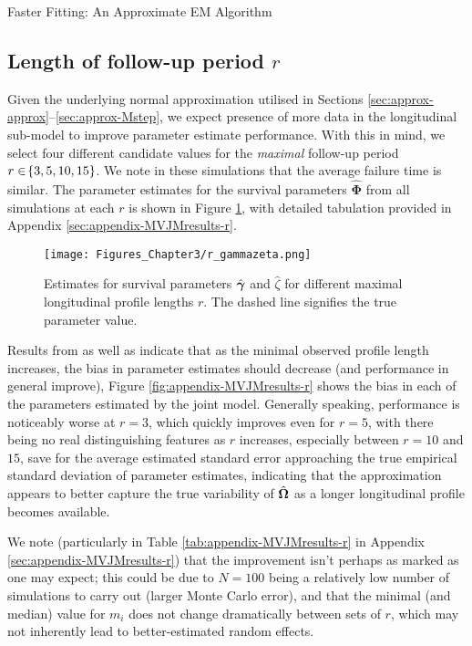 \begin{chapter}{\label{cha:approx}Faster Fitting: An Approximate EM Algorithm}
  \subsection{Length of follow-up period \texorpdfstring{$r$}{r}}\label{sec:approx-sims-r}
  Given the underlying normal approximation utilised in Sections \ref{sec:approx-approx}--\ref{sec:approx-Mstep}, we expect presence of more data in the longitudinal sub-model to improve parameter estimate performance. With this in mind, we select four different candidate values for the \textit{maximal} follow-up period $r\in\!\left\{3,5,10,15\right\}$. We note in these simulations that the average failure time is similar. The parameter estimates for the survival parameters $\hat{\bm{\Phi}}$ from all simulations at each $r$ is shown in Figure \ref{fig:approx-sims-r}, with detailed tabulation provided in Appendix \ref{sec:appendix-MVJMresults-r}.

  \begin{figure}[t]
      \centering
      \texttt{[image: Figures\_Chapter3/r\_gammazeta.png]}
      \caption{Estimates for survival parameters $\hat{\bm{\gamma}}$ and $\hat{\zeta}$ for different maximal longitudinal profile lengths $r$. The dashed line signifies the true parameter value.}
      \label{fig:approx-sims-r}
  \end{figure}

  Results from \citet{Rizopoulos2012} as well as \citet{baghishani2012} indicate that as the minimal observed profile length increases, the bias in parameter estimates should decrease (and performance in general improve), Figure \ref{fig:appendix-MVJMresults-r} shows the bias in each of the parameters estimated by the joint model. Generally speaking, performance is noticeably worse at $r=3$, which quickly improves even for $r=5$, with there being no real distinguishing features as $r$ increases, especially between $r=10$ and $15$, save for the average estimated standard error approaching the true empirical standard deviation of parameter estimates, indicating that the approximation appears to better capture the true variability of $\hat{\bm{\Omega}}$ as a longer longitudinal profile becomes available. 

  \begin{remark}
    We note (particularly in Table \ref{tab:appendix-MVJMresults-r} in Appendix \ref{sec:appendix-MVJMresults-r}) that the improvement isn't perhaps as marked as one may expect; this could be due to $N=100$ being a relatively low number of simulations to carry out (\ie larger Monte Carlo error), and that the minimal (and median) value for $m_i$ does not change dramatically between sets of $r$, which may not inherently lead to better-estimated random effects.
  \end{remark}
  

\end{chapter}
